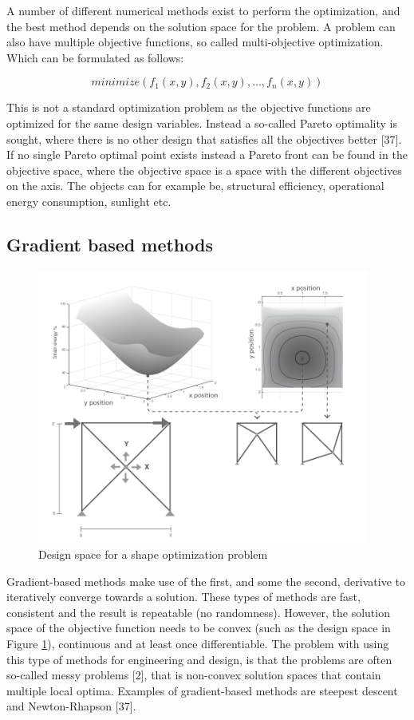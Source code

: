  A number of different numerical methods exist to perform the optimization, and the best method depends on the solution space for the problem. A problem can also have multiple objective functions, so called multi-objective optimization. Which can be formulated as follows:

\begin{equation*}
minimize(f_1(x,y),f_2(x,y), \dotsc, f_n(x,y))
\end{equation*}

This is not a standard optimization problem as the objective functions are optimized for the same design variables. Instead a so-called Pareto optimality is sought, where there is no other design that satisfies all the objectives better [37]. If no single Pareto optimal point exists instead a Pareto front can be found in the objective space, where the objective space is a space with the different objectives on the axis. The objects can for example be, structural efficiency, operational energy consumption, sunlight etc.

\subsection{Gradient based methods}
\begin{figure}
  \includegraphics[width=310pt]{graphics/designspace.png}
  \caption{Design space for a shape optimization problem}
  \label{fig:designspace}
\end{figure}

Gradient-based methods make use of the first, and some the second, derivative to iteratively converge towards a solution. These types of methods are fast, consistent and the result is repeatable (no randomness). However, the solution space of the objective function needs to be convex (such as the design space in Figure \ref{fig:designspace}), continuous and at least once differentiable. The problem with using this type of methods for engineering and design, is that the problems are often so-called messy problems [2], that is non-convex solution spaces that contain multiple local optima. Examples of gradient-based methods are steepest descent and Newton-Rhapson [37]. 

